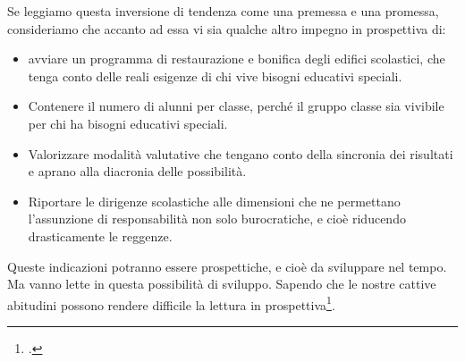 Se leggiamo questa inversione di tendenza come una premessa e una promessa, consideriamo che accanto ad essa vi sia qualche altro impegno in prospettiva di:
\begin{itemize}
	\item avviare un programma di restaurazione e bonifica degli edifici scolastici, che tenga conto delle reali esigenze di chi vive bisogni educativi speciali.
	\item Contenere il numero di alunni per classe, perché il gruppo classe sia vivibile per chi ha bisogni educativi speciali.
	\item Valorizzare modalità valutative che tengano conto della sincronia dei risultati e aprano alla diacronia delle possibilità.
	\item  Riportare le dirigenze scolastiche alle dimensioni che ne permettano l'assunzione di responsabilità non solo burocratiche, e cioè riducendo drasticamente le reggenze.
\end{itemize}
Queste indicazioni potranno essere prospettiche, e cioè da sviluppare nel tempo. Ma vanno lette in questa possibilità di sviluppo. Sapendo che le nostre cattive abitudini possono rendere difficile la lettura in prospettiva\footcite{Canevaro2013}. 